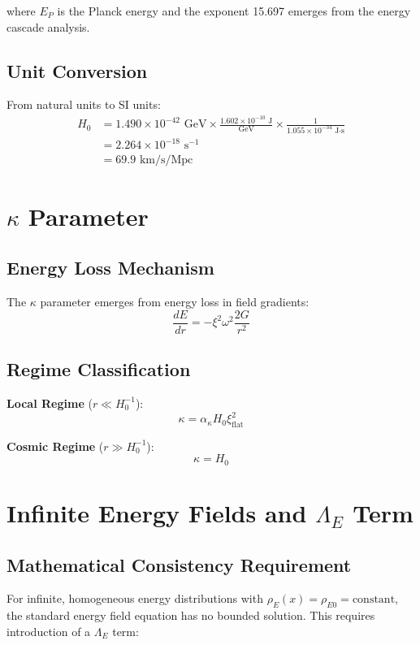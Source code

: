 \documentclass[12pt,a4paper]{article}
\begin{document}
	where $E_P$ is the Planck energy and the exponent 15.697 emerges from the energy cascade analysis.
	
	\subsection{Unit Conversion}
	From natural units to SI units:
	\begin{align}
		H_0 &= 1.490 \times 10^{-42} \text{ GeV} \times \frac{1.602 \times 10^{-10} \text{ J}}{\text{GeV}} \times \frac{1}{1.055 \times 10^{-34} \text{ J·s}} \\
		&= 2.264 \times 10^{-18} \text{ s}^{-1} \\
		&= 69.9 \text{ km/s/Mpc}
	\end{align}
	
	\section{$\kappa$ Parameter}
	
	\subsection{Energy Loss Mechanism}
	The $\kappa$ parameter emerges from energy loss in field gradients:
	\begin{equation}
		\frac{dE}{dr} = -\xi^2 \omega^2 \frac{2G}{r^2}
	\end{equation}
	
	\subsection{Regime Classification}
	\textbf{Local Regime} ($r \ll H_0^{-1}$):
	\begin{equation}
		\kappa = \alpha_\kappa H_0 \xi_{\text{flat}}^2
	\end{equation}
	
	\textbf{Cosmic Regime} ($r \gg H_0^{-1}$):
	\begin{equation}
		\boxed{\kappa = H_0}
	\end{equation}
	
	\section{Infinite Energy Fields and $\Lambda_E$ Term}
	
	\subsection{Mathematical Consistency Requirement}
	For infinite, homogeneous energy distributions with $\rho_E(x) = \rho_{E0} = \text{constant}$, the standard energy field equation has no bounded solution. This requires introduction of a $\Lambda_E$ term:
	
\end{document}
